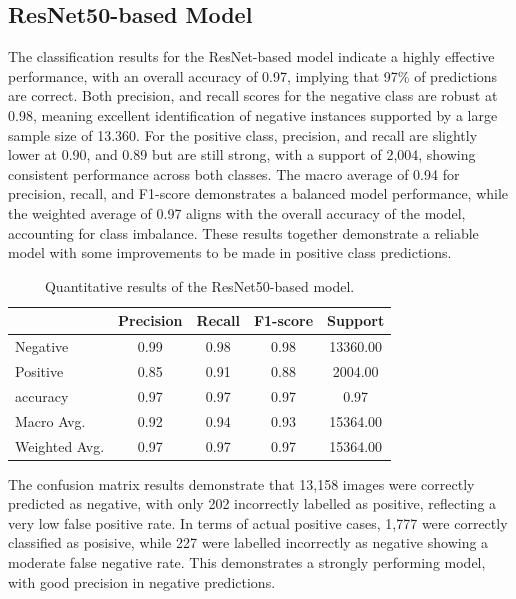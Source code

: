 \documentclass[../main]{subfiles}
\begin{document}
\subsection{ResNet50-based Model}
The classification results for the ResNet-based model indicate a highly effective performance, with an overall accuracy of 0.97, implying that 97\% of predictions are correct. Both precision, and recall scores for the negative class are robust at 0.98, meaning excellent identification of negative instances supported by a large sample size of 13.360. For the positive class, precision, and recall are slightly lower at 0.90, and 0.89 but are still strong, with a support of 2,004, showing consistent performance across both classes. The macro average of 0.94 for precision, recall, and F1-score demonstrates a balanced model performance, while the weighted average of 0.97 aligns with the overall accuracy of the model, accounting for class imbalance. These results together demonstrate a reliable model with some improvements to be made in positive class predictions.

\begin{table}[h]
    \centering
    \begin{tabular}{|l|c|c|c|c|}
        \hline
         & Precision & Recall & F1-score & Support \\ \hline
        Negative & 0.99 & 0.98 & 0.98 & 13360.00 \\ \hline
        Positive & 0.85 & 0.91 & 0.88 & 2004.00 \\ \hline
        accuracy & 0.97 & 0.97 & 0.97 & 0.97 \\ \hline
        Macro Avg. & 0.92 & 0.94 & 0.93 & 15364.00 \\ \hline
        Weighted Avg. & 0.97 & 0.97 & 0.97 & 15364.00 \\ \hline
    \end{tabular}
    \caption{Quantitative results of the ResNet50-based model.}
    \label{tab:quantitative-results-resnet}
\end{table}

\noindent The confusion matrix results demonstrate that 13,158 images were correctly predicted as negative, with only 202 incorrectly labelled as positive, reflecting a very low false positive rate. In terms of actual positive cases, 1,777 were correctly classified as posisive, while 227 were labelled incorrectly as negative showing a moderate false negative rate. This demonstrates a strongly performing model, with good precision in negative predictions.
\end{document}
